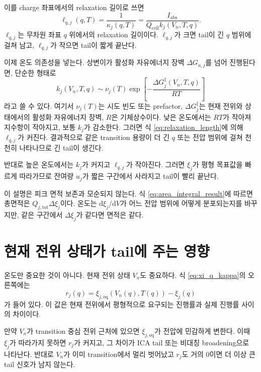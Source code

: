 \documentclass[11pt,a4paper]{article}
\newcommand{\dd}{\mathrm{d}}
\newcommand{\cell}{\mathrm{cell}}
\newcommand{\tot}{\mathrm{tot}}
\newcommand{\eqs}{\mathrm{eq}}
\newcommand{\absI}{I_{\mathrm{abs}}}
\begin{document}
이를 charge 좌표에서의 relaxation 길이로 쓰면
\begin{equation}
\ell_{q,j}(q,T)
=
\frac{1}{\kappa_j(q,T)}
=
\frac{\absI}{Q_{\cell}k_j(V_n,T,q)}.
\label{eq:relaxation_length}
\end{equation}
\(\ell_{q,j}\)는 무차원 좌표 \(q\) 위에서의 relaxation 길이이다. \(\ell_{q,j}\)가 크면 tail이 긴 \(q\) 범위에 걸쳐 남고, \(\ell_{q,j}\)가 작으면 tail이 짧게 끝난다.

이제 온도 의존성을 넣는다. 상변이가 활성화 자유에너지 장벽 \(\Delta G_{a,j}\)를 넘어 진행된다면, 단순한 형태로
\begin{equation}
k_j(V_n,T,q)
\sim
\nu_j(T)
\exp\left[
-\frac{\Delta G^\ddagger_j(V_n,T,q)}{RT}
\right]
\label{eq:activated_rate}
\end{equation}
라고 쓸 수 있다. 여기서 \(\nu_j(T)\)는 시도 빈도 또는 prefactor, \(\Delta G^\ddagger_j\)는 현재 전위와 상태에서의 활성화 자유에너지 장벽, \(R\)은 기체상수이다. 낮은 온도에서는 \(RT\)가 작아져 지수항이 작아지고, 보통 \(k_j\)가 감소한다. 그러면 식 \eqref{eq:relaxation_length}에 의해 \(\ell_{q,j}\)가 커진다. 결과적으로 같은 transition 용량이 더 긴 \(q\) 또는 전압 범위에 걸쳐 천천히 나타나므로 긴 tail이 생긴다.

반대로 높은 온도에서는 \(k_j\)가 커지고 \(\ell_{q,j}\)가 작아진다. 그러면 \(\xi_j\)가 평형 목표값을 빠르게 따라가므로 잔여량 \(u_j\)가 짧은 구간에서 사라지고 tail이 빨리 끝난다.

이 설명은 피크 면적 보존과 모순되지 않는다. 식 \eqref{eq:area_integral_result}에 따르면 총면적은 \(Q_{j,\tot}\Delta \xi_j\)이다. 온도는 \(\dd \xi_j/\dd V\)가 어느 전압 범위에 어떻게 분포되는지를 바꾸지만, 같은 구간에서 \(\Delta\xi_j\)가 같다면 면적은 같다.

\section{현재 전위 상태가 tail에 주는 영향}

온도만 중요한 것이 아니다. 현재 전위 상태 \(V_n\)도 중요하다. 식 \eqref{eq:xi_q_kappa}의 오른쪽에는
\begin{equation}
r_j(q)
=
\xi_{j,\eqs}(V_n(q),T(q))-\xi_j(q)
\label{eq:relaxation_residual}
\end{equation}
가 들어 있다. 이 값은 현재 전위에서 평형적으로 요구되는 진행률과 실제 진행률 사이의 차이이다.

만약 \(V_n\)가 transition 중심 전위 근처에 있으면 \(\xi_{j,\eqs}\)가 전압에 민감하게 변한다. 이때 \(\xi_j\)가 따라가지 못하면 \(r_j\)가 커지고, 그 차이가 ICA tail 또는 비대칭 broadening으로 나타난다. 반대로 \(V_n\)가 이미 transition에서 멀리 벗어났고 \(r_j\)도 거의 0이면 더 이상 큰 tail 신호가 남지 않는다.
\end{document}
